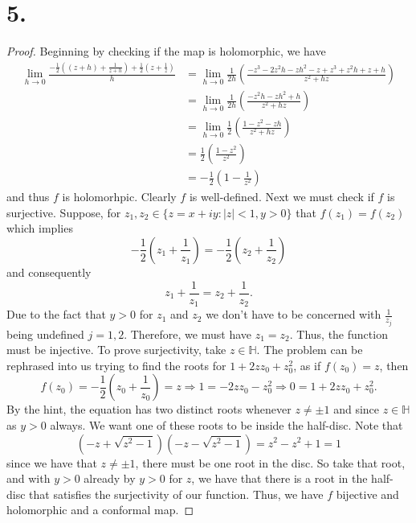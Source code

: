 \documentclass{article}
\begin{document}
\section*{5.}
\begin{proof}
  Beginning by checking if the map is holomorphic, we have 
  \begin{align*}
    \lim\limits_{h \to 0} \frac{-\frac{1}{2}\left(\left(z + h\right) + \frac{1}{z +h}\right) + \frac{1}{2}\left(z + \frac{1}{z}\right)}{h} &=\lim\limits_{h \to 0} \frac{1}{2h} \left(\frac{-z^3-2z^2h-zh^2 - z + z^3 + z^2h + z + h}{z^2 + hz}\right) \\
    &= \lim\limits_{h \to 0}\frac{1}{2h}\left(\frac{-z^2h-zh^2 + h}{z^2 + hz} \right) \\
    & = \lim\limits_{h \to 0} \frac{1}{2} \left(\frac{1 - z^2 - zh}{z^2 + hz} \right) \\
    &= \frac{1}{2}\left(\frac{1 - z^2}{z^2} \right) \\
    &= -\frac{1}{2} \left(1 - \frac{1}{z^2} \right) 
  \end{align*}
  and thus $f$ is holomorhpic. Clearly $f$ is well-defined. Next we must check if $f$ is surjective. Suppose, for $z_1, z_2 \in \{z = x + iy : |z| < 1 ,y > 0 \}$ that $f(z_1) = f(z_2)$ which implies 
  \[
  -\frac{1}{2}\left(z_1 + \frac{1}{z_1} \right) = -\frac{1}{2}\left(z_2 + \frac{1}{z_2} \right)  
  \] 
  and consequently 
  \[
  z_1 + \frac{1}{z_1} = z_2 + \frac{1}{z_2}.  
  \]
  Due to the fact that $y > 0$ for $z_1$ and $z_2$ we don't have to be concerned with $\frac{1}{z_j}$ being undefined $j = 1, 2$. Therefore, we must have $z_1 = z_2$. Thus, the function must be injective. To prove surjectivity, take $z \in \mathbb{H}$. The problem can be rephrased into us trying to find the roots for $1 + 2zz_0 + z_0^2$, as if $f(z_0) = z$, then 
  \[
  f(z_0) = -\frac{1}{2} \left(z_0 + \frac{1}{z_0} \right) = z\Rightarrow 1 = -2zz_0 - z_0^2 \Rightarrow 0 = 1 + 2zz_0 + z_0^2.
  \]
  By the hint, the equation has two distinct roots whenever $z \neq \pm 1$ and since $z \in \mathbb{H}$ as $y > 0$ always. We want one of these roots to be inside the half-disc. Note that  
  \[
  (-z +  \sqrt{z^2-1})(-z-\sqrt{z^2 - 1}) = z^2 - z^2 + 1 = 1
  \]
  since we have that $z \neq \pm 1$, there must be one root in the disc. So take that root, and with $y > 0$ already by $y > 0$ for $z$, we have that there is a root in the half-disc that satisfies the surjectivity of our function. Thus, we have $f$ bijective and holomorphic and a conformal map. 
\end{proof}
\end{document}
